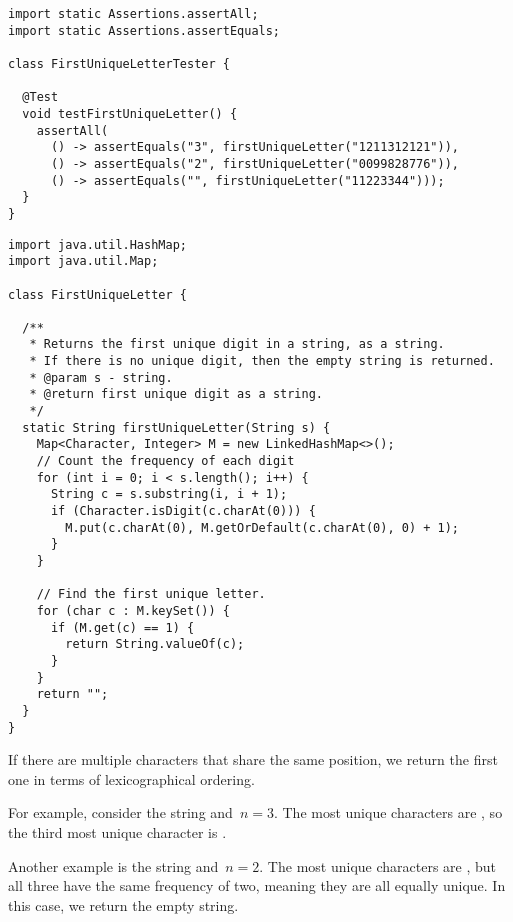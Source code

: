 \begin{lstlisting}[language=MyJava]
import static Assertions.assertAll;
import static Assertions.assertEquals;

class FirstUniqueLetterTester {

  @Test
  void testFirstUniqueLetter() {
    assertAll(
      () -> assertEquals("3", firstUniqueLetter("1211312121")),
      () -> assertEquals("2", firstUniqueLetter("0099828776")),
      () -> assertEquals("", firstUniqueLetter("11223344")));
  }
}
\end{lstlisting}

\begin{lstlisting}[language=MyJava]
import java.util.HashMap;
import java.util.Map;

class FirstUniqueLetter {

  /**
   * Returns the first unique digit in a string, as a string. 
   * If there is no unique digit, then the empty string is returned.
   * @param s - string.
   * @return first unique digit as a string.
   */
  static String firstUniqueLetter(String s) {
    Map<Character, Integer> M = new LinkedHashMap<>();
    // Count the frequency of each digit
    for (int i = 0; i < s.length(); i++) {
      String c = s.substring(i, i + 1);
      if (Character.isDigit(c.charAt(0))) {
        M.put(c.charAt(0), M.getOrDefault(c.charAt(0), 0) + 1);
      }
    }

    // Find the first unique letter.
    for (char c : M.keySet()) {
      if (M.get(c) == 1) {
        return String.valueOf(c);
      }
    }
    return "";
  }
}
\end{lstlisting}

If there are multiple characters that share the same position, we return the first one in terms of lexicographical ordering.

For example, consider the string  and~$n=3$. 
The most unique characters are , so the third most unique character is .

Another example is the string  and~$n=2$. 
The most unique characters are , but all three have the same frequency of two, meaning they are all equally unique. 
In this case, we return the empty string.

